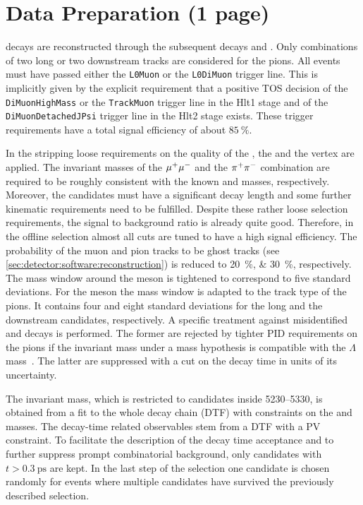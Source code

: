 
\section{Data Preparation (1 page)}
\label{sec:bd2jpsiks:datapreparation}


\BdToJPsiKS decays are reconstructed through the subsequent decays
\mbox{\JPsiToMuMu} and \KSToPiPi. Only combinations of two long or two
downstream tracks are considered for the pions. All events must have passed
either the \texttt{L0Muon} or the \texttt{L0DiMuon} trigger line. This is
implicitly given by the explicit requirement that a positive \jpsi TOS
decision of the \texttt{DiMuonHighMass} or the \texttt{TrackMuon} trigger line
in the Hlt1 stage and of the \texttt{DiMuonDetachedJPsi} trigger line in the
Hlt2 stage exists. These trigger requirements have a total signal efficiency
of about $\SI{85}{\percent}$.

In the stripping loose requirements on the quality of the \jpsi, the \KS and
the \Bd vertex are applied. The invariant masses of the ${\mu^+\mu^-}$ and the
${{\pi}^+}{{\pi}^-}$ combination are required to be roughly consistent with the known
\jpsi and \KS masses, respectively. Moreover, the \KS candidates must have a
significant decay length and some further kinematic requirements need to be
fulfilled. Despite these rather loose selection requirements, the signal to
background ratio is already quite good. Therefore, in the offline selection
almost all cuts are tuned to have a high signal efficiency. The probability of
the muon and pion tracks to be ghost tracks (see
\cref{sec:detector:software:reconstruction}) is reduced to
\SIlist{20;30}{\percent}, respectively. The mass window around the \jpsi meson
is tightened to correspond to five standard deviations. For the \KS meson the
mass window is adapted to the track type of the pions. It contains four and
eight standard deviations for the long and the downstream candidates,
respectively. A specific treatment against misidentified \LbToJPsiL and
\BdToJPsiKstar decays is performed. The former are rejected by tighter PID
requirements on the pions if the invariant mass under a \pion\proton mass
hypothesis is compatible with the $\Lambda$ mass~\cite{PDG2014}. The latter
are suppressed with a cut on the \KS decay time in units of its uncertainty.

The invariant \Bd mass, which is restricted to candidates inside
\SIrange{5230}{5330}{\MeVcc}, is obtained from a fit to the whole decay chain
(DTF) with constraints on the \jpsi and \KS masses. The decay-time related
observables stem from a DTF with a PV constraint. To facilitate the
description of the decay time acceptance and to further suppress prompt
combinatorial background, only candidates with $t > \SI{0.3}{\ps}$ are kept.
In the last step of the selection one candidate is chosen randomly for events
where multiple candidates have survived the previously described selection.
